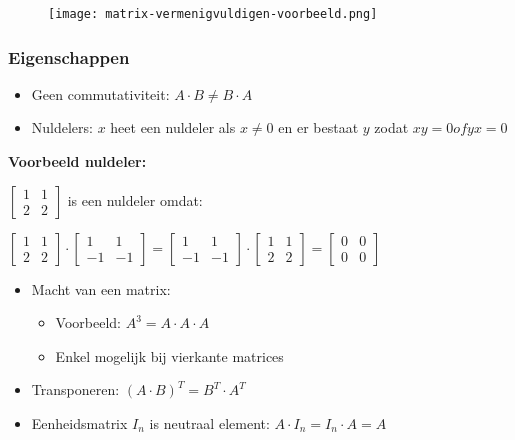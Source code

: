 \documentclass{article}
\begin{document}
\begin{figure}[H]
    \centering
    \texttt{[image: matrix-vermenigvuldigen-voorbeeld.png]}
\end{figure}


\subsubsection{Eigenschappen}

\begin{itemize}
    \item Geen commutativiteit: $A \cdot B \neq B \cdot A$
    \item Nuldelers: $x$ heet een nuldeler als $x \neq 0$ en er bestaat $y$ zodat $xy = 0 of yx = 0$
\end{itemize}

\textbf{Voorbeeld nuldeler:}

$\begin{bmatrix}
1 & 1\\
2 & 2
\end{bmatrix}$ is een nuldeler omdat: 

$\begin{bmatrix}
    1 & 1\\
    2 & 2
\end{bmatrix} \cdot 
\begin{bmatrix}
    1 & 1\\
    -1 & -1
\end{bmatrix} = 
\begin{bmatrix}
    1 & 1\\
    -1 & -1
\end{bmatrix}
 \cdot 
\begin{bmatrix}
    1 & 1\\
    2 & 2
\end{bmatrix} =
\begin{bmatrix}
    0 & 0\\
    0 & 0
\end{bmatrix}$

\begin{itemize}
    \item Macht van een matrix:
    \begin{itemize}
        \item Voorbeeld: $A^3 = A \cdot A \cdot A$
        \item Enkel mogelijk bij vierkante matrices
    \end{itemize}
    \item Transponeren: $(A\cdot B)^T = B^T \cdot A^T$
    \item Eenheidsmatrix $I_n$ is neutraal element: $A \cdot I_n = I_n \cdot A = A$
\end{itemize}
\end{document}
